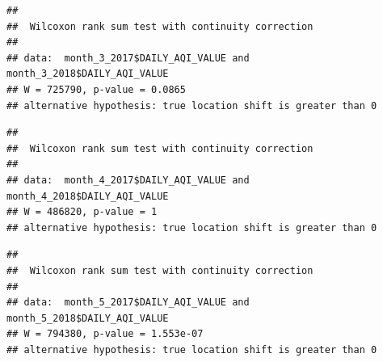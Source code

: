 \documentclass[12pt,]{article}
\newenvironment{Shaded}{\begin{snugshade}}{\end{snugshade}}
\newcommand{\KeywordTok}[1]{\textcolor[rgb]{0.13,0.29,0.53}{\textbf{#1}}}
\newcommand{\DataTypeTok}[1]{\textcolor[rgb]{0.13,0.29,0.53}{#1}}
\newcommand{\DecValTok}[1]{\textcolor[rgb]{0.00,0.00,0.81}{#1}}
\newcommand{\StringTok}[1]{\textcolor[rgb]{0.31,0.60,0.02}{#1}}
\newcommand{\OperatorTok}[1]{\textcolor[rgb]{0.81,0.36,0.00}{\textbf{#1}}}
\newcommand{\NormalTok}[1]{#1}
\begin{document}
\begin{Shaded}
\end{Shaded}

\begin{verbatim}
## 
##  Wilcoxon rank sum test with continuity correction
## 
## data:  month_3_2017$DAILY_AQI_VALUE and month_3_2018$DAILY_AQI_VALUE
## W = 725790, p-value = 0.0865
## alternative hypothesis: true location shift is greater than 0
\end{verbatim}

\begin{Shaded}
\end{Shaded}

\begin{verbatim}
## 
##  Wilcoxon rank sum test with continuity correction
## 
## data:  month_4_2017$DAILY_AQI_VALUE and month_4_2018$DAILY_AQI_VALUE
## W = 486820, p-value = 1
## alternative hypothesis: true location shift is greater than 0
\end{verbatim}

\begin{Shaded}
\end{Shaded}

\begin{verbatim}
## 
##  Wilcoxon rank sum test with continuity correction
## 
## data:  month_5_2017$DAILY_AQI_VALUE and month_5_2018$DAILY_AQI_VALUE
## W = 794380, p-value = 1.553e-07
## alternative hypothesis: true location shift is greater than 0
\end{verbatim}
\end{document}
